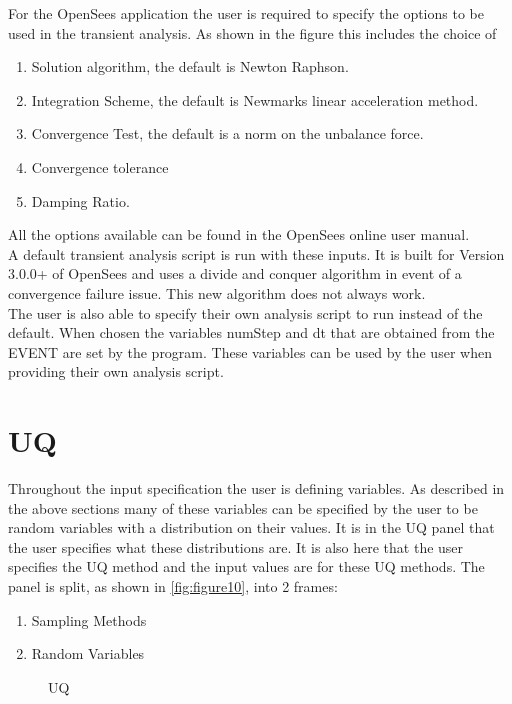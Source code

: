 For the OpenSees application the user is required to specify the options to be used in the transient analysis. As shown in the figure this includes the choice of 
\begin{enumerate}
\item Solution algorithm, the default is Newton Raphson.
\item Integration Scheme, the default is Newmarks linear acceleration method.
\item Convergence Test, the default is a norm on the unbalance force.
\item Convergence tolerance
\item Damping Ratio.
\end{enumerate}

All the options available can be found in the OpenSees online user manual.\\

A default transient analysis script is run with these inputs. It is built for Version 3.0.0+ of OpenSees and uses a divide and conquer  algorithm in event of a convergence failure issue. This new algorithm does not always work. \\

The user is also able to specify their 
own analysis script to run instead of the default. When chosen the variables numStep and dt that are obtained from the EVENT are set by the program. These variables can be used by the user when providing their own analysis script.

\section{UQ}
Throughout the input specification the user is defining variables. As described in the above sections many of these variables can be specified by the user to be random variables with a distribution on their values. It is in the UQ panel that the user specifies what these distributions are. 
It is also here that the user specifies the UQ method and the input values are for these UQ methods. 
The panel is split,  as shown in \autoref{fig:figure10}, into 2 frames:
 \begin{enumerate}
\item Sampling Methods 
\item Random Variables
\end{enumerate}

\begin{figure}[!htbp]
  \caption{UQ}
  \label{fig:figure10}
\end{figure}


